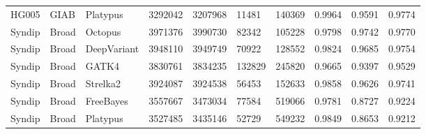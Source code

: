 \documentclass{article}
\begin{document}
\begin{table}[ht!]
{\begin{tabular}{llllllllll}
      HG005 &         GIAB &     Platypus &           3292042 &       3207968 &     11481 &    140369 &    0.9964 &      0.9591 &    0.9774 \\
     Syndip &        Broad &      Octopus &           3971376 &       3990730 &     82342 &    105228 &    0.9798 &      0.9742 &    0.9770 \\
     Syndip &        Broad &  DeepVariant &           3948110 &       3949749 &     70922 &    128552 &    0.9824 &      0.9685 &    0.9754 \\
     Syndip &        Broad &        GATK4 &           3830761 &       3834235 &    132829 &    245820 &    0.9665 &      0.9397 &    0.9529 \\
     Syndip &        Broad &     Strelka2 &           3924087 &       3924538 &     56453 &    152633 &    0.9858 &      0.9626 &    0.9741 \\
     Syndip &        Broad &    FreeBayes &           3557667 &       3473034 &     77584 &    519066 &    0.9781 &      0.8727 &    0.9224 \\
     Syndip &        Broad &     Platypus &           3527485 &       3435146 &     52729 &    549232 &    0.9849 &      0.8653 &    0.9212 \\
    \bottomrule
    \end{tabular}
    }
\end{table}

\clearpage
\end{document}
